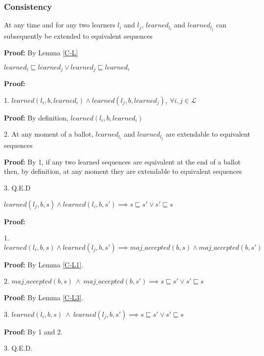 \subsubsection{Consistency}
\begin{theorem}At any time and for any two learners $l_i$ and $l_j$, $learned_{l_i}$ and $learned_{l_j}$ can subsequently be extended to equivalent sequences
\end{theorem} 
\textbf{Proof:} By Lemma \ref{C-L}
\begin{lemma}
$learned_i \sqsubseteq learned_j \lor learned_j \sqsubseteq  learned_i$ \label{C-L} \par
\end{lemma}
\textbf{Proof:} \par
1. $learned(l_i,b,learned_i) \land learned(l_j,b,learned_j),\ \forall i,j \in \mathcal{L}$ \par
\indent\indent\textbf{Proof:} By definition, $learned(l_i,b,learned_i)$ \par
2. At any moment of a ballot, $learned_{l_i}$ and $learned_{l_j}$ are extendable to equivalent sequences \par
\indent\indent\textbf{Proof:} By 1, if any two learned sequences are equivalent at the end of a ballot then, by definition, at any moment they are extendable to equivalent sequences\par
3. Q.E.D \par

\begin{lemma}
$learned(l_j,b,s) \land learned(l_i,b,s') \implies s \sqsubseteq s' \lor s' \sqsubseteq s$ \par
\end{lemma}
\textbf{Proof:} \par
1. $learned(l_i,b,s) \land learned(l_j,b,s') \implies maj\_accepted(b,s) \land maj\_accepted(b,s')$ \par
\indent\indent\textbf{Proof:} By Lemma \ref{C-L1}.\par
2. $maj\_accepted(b,s)\ \land\ maj\_accepted(b,s') \implies s \sqsubseteq s' \lor s' \sqsubseteq s$ \par
\indent\indent\textbf{Proof:} By Lemma \ref{C-L3}.\par
3. $learned(l_i,b,s)\ \land\ learned(l_j,b,s') \implies s \sqsubseteq s' \lor s' \sqsubseteq s$ \par
\indent\indent\textbf{Proof:} By 1 and 2.\par
3. Q.E.D. \par

